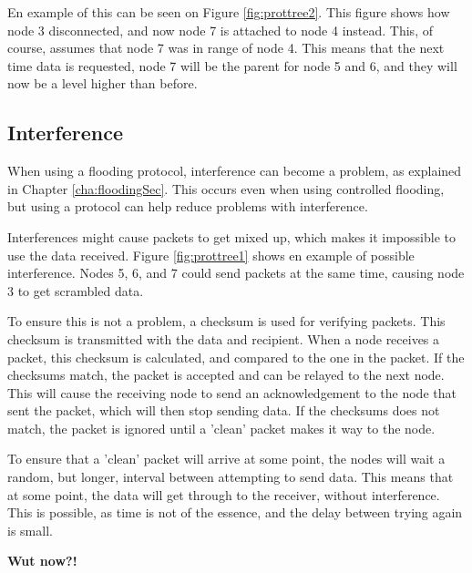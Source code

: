 En example of this can be seen on Figure \ref{fig:prottree2}. This figure shows how node 3 disconnected, and now node 7 is attached to node 4 instead. This, of course, assumes that node 7 was in range of node 4.
This means that the next time data is requested, node 7 will be the parent for node 5 and 6, and they will now be a level higher than before.

\subsection*{Interference}
When using a flooding protocol, interference can become a problem, as explained in Chapter \ref{cha:floodingSec}. This occurs even when using controlled flooding, but using a protocol can help reduce problems with interference.

Interferences might cause packets to get mixed up, which makes it impossible to use the data received. Figure \ref{fig:prottree1} shows en example of possible interference. Nodes 5, 6, and 7 could send packets at the same time, causing node 3 to get scrambled data.

To ensure this is not a problem, a checksum is used for verifying packets. This checksum is transmitted with the data and recipient. When a node receives a packet, this checksum is calculated, and compared to the one in the packet. If the checksums match, the packet is accepted and can be relayed to the next node. This will cause the receiving node to send an acknowledgement to the node that sent the packet, which will then stop sending data.
If the checksums does not match, the packet is ignored until a 'clean' packet makes it way to the node.

To ensure that a 'clean' packet will arrive at some point, the nodes will wait a random, but longer, interval between attempting to send data. This means that at some point, the data will get through to the receiver, without interference.
This is possible, as time is not of the essence, and the delay between trying again is small.

\textbf{Wut now?!}
